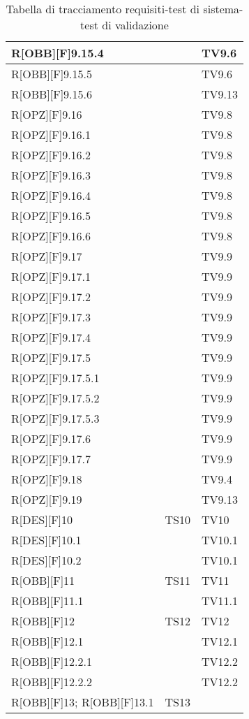 	\begin{table}[h]
		\begin{tabular}{|p{}|p{}|p{}|}
			\midrule


			R[OBB][F]9.15.4 &  & TV9.6 \\ \midrule
			R[OBB][F]9.15.5 &  & TV9.6 \\ \midrule
			R[OBB][F]9.15.6 &  & TV9.13 \\ \midrule
			R[OPZ][F]9.16 &  & TV9.8 \\ \midrule
			R[OPZ][F]9.16.1 &  & TV9.8 \\ \midrule
			R[OPZ][F]9.16.2 &  & TV9.8 \\ \midrule
			R[OPZ][F]9.16.3 &  & TV9.8 \\ \midrule
			R[OPZ][F]9.16.4 &  & TV9.8 \\ \midrule
			R[OPZ][F]9.16.5 &  & TV9.8 \\ \midrule
			R[OPZ][F]9.16.6 &  & TV9.8 \\ \midrule
			R[OPZ][F]9.17 &  & TV9.9 \\ \midrule
			R[OPZ][F]9.17.1 &  & TV9.9 \\ \midrule
			R[OPZ][F]9.17.2 &  & TV9.9 \\ \midrule
			R[OPZ][F]9.17.3 &  & TV9.9 \\ \midrule
			R[OPZ][F]9.17.4 &  & TV9.9 \\ \midrule
			R[OPZ][F]9.17.5 &  & TV9.9 \\ \midrule
			R[OPZ][F]9.17.5.1 &  & TV9.9 \\ \midrule
			R[OPZ][F]9.17.5.2 &  & TV9.9 \\ \midrule
			R[OPZ][F]9.17.5.3 &  & TV9.9 \\ \midrule
			R[OPZ][F]9.17.6 &  & TV9.9 \\ \midrule
			R[OPZ][F]9.17.7 &  & TV9.9 \\ \midrule
			R[OPZ][F]9.18 &  & TV9.4 \\ \midrule
			R[OPZ][F]9.19 &  & TV9.13 \\ \midrule
			R[DES][F]10 & TS10 & TV10 \\ \midrule
			R[DES][F]10.1 &  & TV10.1 \\ \midrule
			R[DES][F]10.2 &  & TV10.1 \\ \midrule
			R[OBB][F]11 & TS11 & TV11  \\ \midrule
			R[OBB][F]11.1 &  & TV11.1 \\ \midrule
			R[OBB][F]12 & TS12 & TV12 \\ \midrule
			R[OBB][F]12.1 &  & TV12.1 \\ \midrule
			R[OBB][F]12.2.1 &  & TV12.2 \\ \midrule
			R[OBB][F]12.2.2 &  & TV12.2 \\ \midrule
			R[OBB][F]13; R[OBB][F]13.1  & TS13 &  \\

	
			\bottomrule
	
		\end{tabular}
		\caption{Tabella di tracciamento requisiti-test di sistema-test di validazione}
	\end{table}
	\newpage